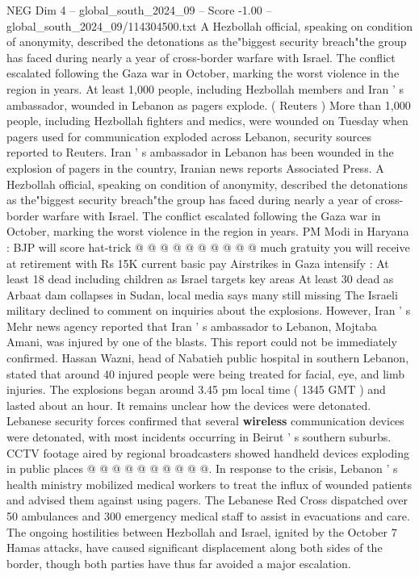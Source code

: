 \begin{textsample}{NEG Dim 4 – global\_south\_2024\_09 – Score -1.00 – global\_south\_2024\_09/114304500.txt}  \label{ex:f4_neg_184}
A Hezbollah official, speaking on condition of anonymity, described the detonations as the"biggest security breach"the group has faced during nearly a year of cross-border warfare with Israel.
The conflict escalated following the Gaza war in October, marking the worst violence in the region in years.
At least 1,000 people, including Hezbollah members and Iran ' s ambassador, wounded in Lebanon as pagers explode. ( Reuters ) More than 1,000 people, including Hezbollah fighters and medics, were wounded on Tuesday when pagers used for communication exploded across Lebanon, security sources reported to Reuters.
Iran ' s ambassador in Lebanon has been wounded in the explosion of pagers in the country, Iranian news reports Associated Press.
A Hezbollah official, speaking on condition of anonymity, described the detonations as the"biggest security breach"the group has faced during nearly a year of cross-border warfare with Israel.
The conflict escalated following the Gaza war in October, marking the worst violence in the region in years.
PM Modi in Haryana : BJP will score hat-trick @ @ @ @ @ @ @ @ @ @ much gratuity you will receive at retirement with Rs 15K current basic pay Airstrikes in Gaza intensify : At least 18 dead including children as Israel targets key areas At least 30 dead as Arbaat dam collapses in Sudan, local media says many still missing The Israeli military declined to comment on inquiries about the explosions.
However, Iran ' s Mehr news agency reported that Iran ' s ambassador to Lebanon, Mojtaba Amani, was injured by one of the blasts.
This report could not be immediately confirmed.
Hassan Wazni, head of Nabatieh public hospital in southern Lebanon, stated that around 40 injured people were being treated for facial, eye, and limb injuries.
The explosions began around 3.45 pm local time ( 1345 GMT ) and lasted about an hour.
It remains unclear how the devices were detonated.
Lebanese security forces confirmed that several \textbf{wireless} communication devices were detonated, with most incidents occurring in Beirut ' s southern suburbs.
CCTV footage aired by regional broadcasters showed handheld devices exploding in public places @ @ @ @ @ @ @ @ @ @.
In response to the crisis, Lebanon ' s health ministry mobilized medical workers to treat the influx of wounded patients and advised them against using pagers.
The Lebanese Red Cross dispatched over 50 ambulances and 300 emergency medical staff to assist in evacuations and care.
The ongoing hostilities between Hezbollah and Israel, ignited by the October 7 Hamas attacks, have caused significant displacement along both sides of the border, though both parties have thus far avoided a major escalation.

\end{textsample}
